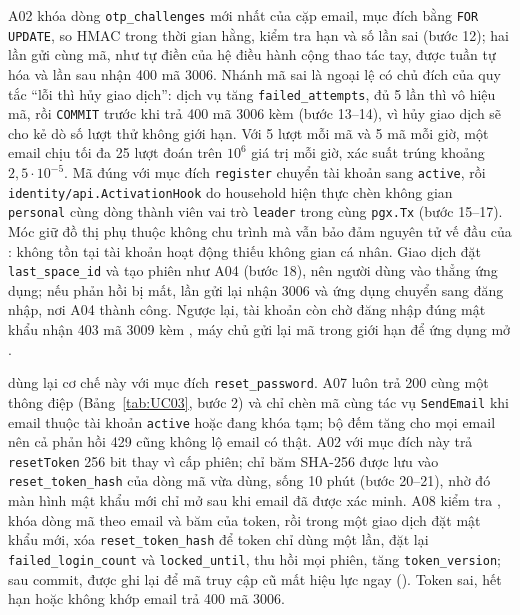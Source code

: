 A02 khóa dòng \texttt{otp\_challenges} mới nhất của cặp email, mục đích bằng \texttt{FOR UPDATE}, so HMAC trong thời gian hằng, kiểm tra hạn và số lần sai (bước 12); hai lần gửi cùng mã, như tự điền của hệ điều hành cộng thao tác tay, được tuần tự hóa và lần sau nhận 400 mã 3006. Nhánh mã sai là ngoại lệ có chủ đích của quy tắc “lỗi thì hủy giao dịch”: dịch vụ tăng \texttt{failed\_attempts}, đủ 5 lần thì vô hiệu mã, rồi \texttt{COMMIT} trước khi trả 400 mã 3006 kèm  (bước 13--14), vì hủy giao dịch sẽ cho kẻ dò số lượt thử không giới hạn. Với 5 lượt mỗi mã và 5 mã mỗi giờ, một email chịu tối đa 25 lượt đoán trên $10^6$ giá trị mỗi giờ, xác suất trúng khoảng $2{,}5 \cdot 10^{-5}$. Mã đúng với mục đích \texttt{register} chuyển tài khoản sang \texttt{active}, rồi \texttt{identity/api.ActivationHook} do household hiện thực chèn không gian \texttt{personal} cùng dòng thành viên vai trò \texttt{leader} trong cùng \texttt{pgx.Tx} (bước 15--17). Móc giữ đồ thị phụ thuộc không chu trình mà vẫn bảo đảm nguyên tử vế đầu của : không tồn tại tài khoản hoạt động thiếu không gian cá nhân. Giao dịch đặt \texttt{last\_space\_id} và tạo phiên như A04 (bước 18), nên người dùng vào thẳng ứng dụng; nếu phản hồi bị mất, lần gửi lại nhận 3006 và ứng dụng chuyển sang đăng nhập, nơi A04 thành công. Ngược lại, tài khoản còn chờ đăng nhập đúng mật khẩu nhận 403 mã 3009 kèm , máy chủ gửi lại mã trong giới hạn  để ứng dụng mở .

 dùng lại cơ chế này với mục đích \texttt{reset\_password}. A07 luôn trả 200 cùng một thông điệp (Bảng~\ref{tab:UC03}, bước 2) và chỉ chèn mã cùng tác vụ \texttt{SendEmail} khi email thuộc tài khoản \texttt{active} hoặc đang khóa tạm; bộ đếm  tăng cho mọi email nên cả phản hồi 429 cũng không lộ email có thật. A02 với mục đích này trả \texttt{resetToken} 256 bit thay vì cấp phiên; chỉ băm SHA-256 được lưu vào \texttt{reset\_token\_hash} của dòng mã vừa dùng, sống 10 phút (bước 20--21), nhờ đó màn hình mật khẩu mới chỉ mở sau khi email đã được xác minh. A08 kiểm tra , khóa dòng mã theo email và băm của token, rồi trong một giao dịch đặt mật khẩu mới, xóa \texttt{reset\_token\_hash} để token chỉ dùng một lần, đặt lại \texttt{failed\_login\_count} và \texttt{locked\_until}, thu hồi mọi phiên, tăng \texttt{token\_version}; sau commit,  được ghi lại để mã truy cập cũ mất hiệu lực ngay (). Token sai, hết hạn hoặc không khớp email trả 400 mã 3006.
